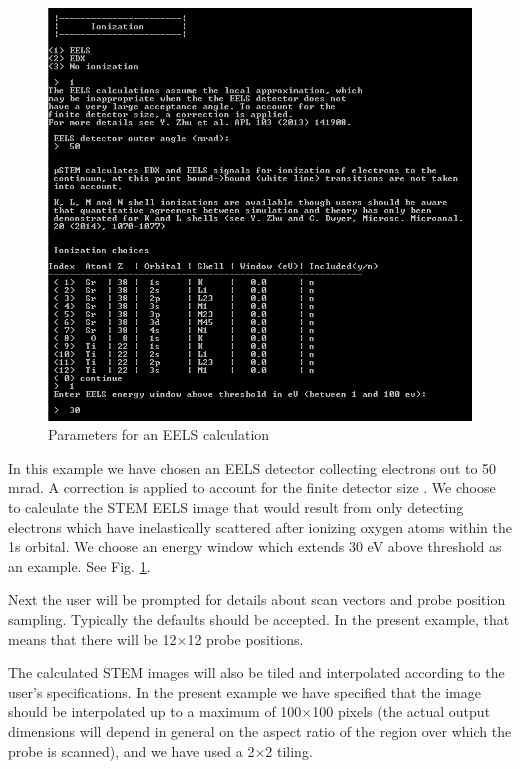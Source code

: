 \documentclass[12pt,a4paper]{article}
\newcommand{\by}{$\times$}
\begin{document}
\begin{figure}[!h]
\begin{center}
    \includegraphics[scale=0.75]{figures/cb_abs_EELS.png}
\caption{Parameters for an EELS calculation}
\label{fig:cb_abs_EELS}
\end{center}
\end{figure}

In this example we have chosen an EELS detector collecting electrons out to 50 mrad.
A correction is applied to account for the finite detector size \cite{Zhu2013}.
We choose to calculate the STEM EELS image that would result from only detecting electrons which have inelastically scattered after ionizing oxygen atoms within the 1s orbital.
We choose an energy window which extends 30 eV above threshold as an example.
See Fig. \ref{fig:cb_abs_EELS}.

Next the user will be prompted for details about scan vectors and probe position sampling.
Typically the defaults should be accepted.
In the present example, that means that there will be 12\by12 probe positions.

The calculated STEM images will also be tiled and interpolated according to the user's specifications.
In the present example we have specified that the image should be interpolated up to a maximum of 100\by100 pixels (the actual output dimensions will depend in general on the aspect ratio of the region over which the probe is scanned), and we have used a 2\by2 tiling.
\end{document}
